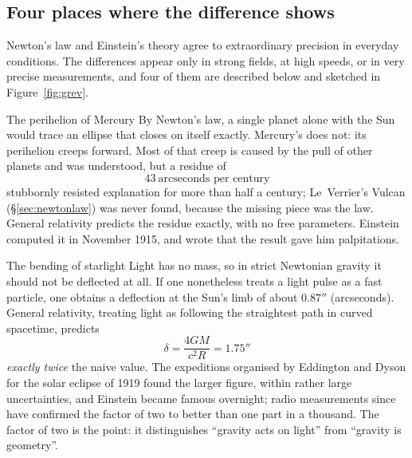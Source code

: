\subsection{Four places where the difference shows}

Newton's law and Einstein's theory agree to extraordinary precision in everyday conditions. The differences
appear only in strong fields, at high speeds, or in very precise measurements, and four of them are described
below and sketched in Figure~\ref{fig:grev}.

\begin{figure}[htbp]
\centering
{}
\end{figure}

\begin{remarkbox}{The perihelion of Mercury}
By Newton's law, a single planet alone with the Sun would trace an ellipse that closes on itself exactly. Mercury's does not: its
perihelion creeps forward. Most of that creep is caused by the pull of other planets and was
understood, but a residue of
\[
43\ \text{arcseconds per century}
\]
stubbornly resisted explanation for more than half a century; Le~Verrier's Vulcan
(\S\ref{sec:newtonlaw}) was never found, because the missing piece was the law. General relativity predicts the residue exactly, with no free parameters. Einstein
computed it in November 1915, and wrote that the result gave him palpitations.
\end{remarkbox}

\begin{remarkbox}{The bending of starlight}
Light has no mass, so in strict Newtonian gravity it should not be deflected at all. If one nonetheless
treats a light pulse as a fast particle, one obtains a deflection at the Sun's limb of about
$0.87''$ (arcseconds). General relativity, treating light as following the straightest path in curved spacetime,
predicts
\[
\delta=\frac{4GM}{c^{2}R}=1.75''
\]
\emph{exactly twice} the naive value. The expeditions organised by Eddington and Dyson for the solar
eclipse of 1919 found the larger figure, within rather large uncertainties, and Einstein became famous
overnight; radio measurements since have confirmed the factor of two to better than one part in a
thousand. The factor of two is the point: it
distinguishes ``gravity acts on light'' from ``gravity is geometry''.
\end{remarkbox}

